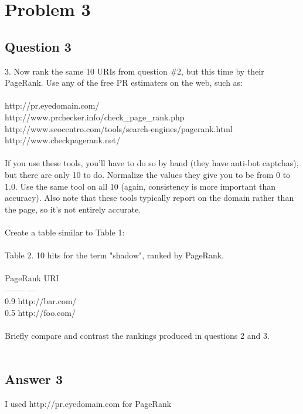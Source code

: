 \documentclass[10pt,letterpaper]{article}
\begin{document}
\pagebreak
\section{Problem 3}
\subsection{Question 3}
3.  Now rank the same 10 URIs from question \#2, but this time 
by their PageRank.  Use any of the free PR estimaters on the web,
such as:\\
\\
http://pr.eyedomain.com/\\
http://www.prchecker.info/check\_page\_rank.php\\
http://www.seocentro.com/tools/search-engines/pagerank.html\\
http://www.checkpagerank.net/\\
\\
If you use these tools, you'll have to do so by hand (they have
anti-bot captchas), but there are only 10 to do.  Normalize the
values they give you to be from 0 to 1.0.  Use the same tool on all
10 (again, consistency is more important than accuracy).  Also
note that these tools typically report on the domain rather than
the page, so it's not entirely accurate.\\  
\\
Create a table similar to Table 1:\\
\\
Table 2.  10 hits for the term "shadow", ranked by PageRank.\\
\\
PageRank	URI\\
--------	---\\
0.9		http://bar.com/\\
0.5		http://foo.com/\\
\\
Briefly compare and contrast the rankings produced in questions 2
and 3.\\
\\
\subsection{Answer 3}

I used http://pr.eyedomain.com for PageRank\\
\\
\end{document}
